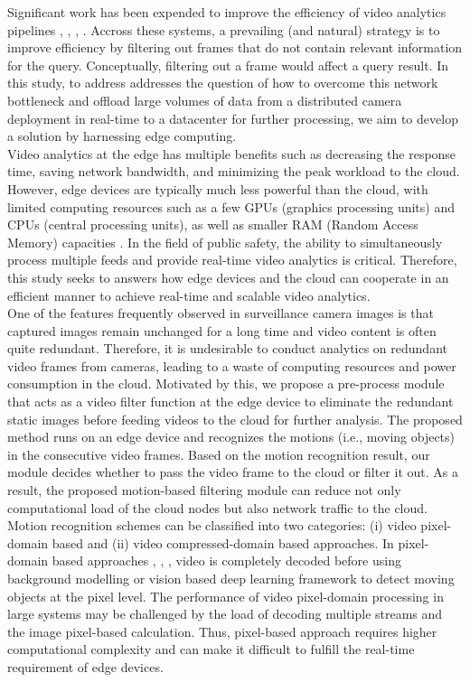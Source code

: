 Significant work has been expended to improve the efficiency of video analytics pipelines \cite{canel2019scaling}, \cite{chen2015glimpse}, \cite{hsieh2018focus}, \cite{jiang2018chameleon}. Accross these systems, a prevailing (and natural) strategy is to improve efficiency by filtering out frames that do not contain relevant information for the query. Conceptually, filtering out a frame would affect a query result. In this study, to address addresses the question of how to overcome this network bottleneck and offload large volumes of data from a distributed camera deployment in real-time to a datacenter for further processing, we aim to develop a solution by harnessing edge computing. \\
Video analytics at the edge has multiple benefits such as decreasing the response time, saving network bandwidth, and minimizing the peak workload to the cloud. However, edge devices are typically much less powerful than the cloud, with limited computing resources such as a few GPUs (graphics processing units) and CPUs (central processing units), as well as smaller RAM (Random Access Memory) capacities \cite{stone2019towards}. In the field of public safety, the ability to simultaneously process multiple feeds and provide real-time video analytics is critical. Therefore, this study seeks to answers how edge devices and the cloud can cooperate in an efficient manner to achieve real-time and scalable video analytics.  \\
One of the features frequently observed in surveillance camera images is that captured images remain unchanged for a long time and video content is often quite redundant. Therefore, it is undesirable to conduct analytics on redundant video frames from cameras, leading to a waste of computing resources and power consumption in the cloud. Motivated by this, we propose a pre-process module that acts as a video filter function at the edge device to eliminate the redundant static images before feeding videos to the cloud for further analysis. The proposed method runs on an edge device and recognizes the motions (i.e., moving objects) in the consecutive video frames. Based on the motion recognition result, our module decides whether to pass the video frame to the cloud or filter it out. As a result, the proposed motion-based filtering module can reduce not only computational load of the cloud nodes but also network traffic to the cloud. \\
Motion recognition schemes can be classified into two categories: (i) video pixel-domain based and (ii) video compressed-domain based approaches. In pixel-domain based approaches \cite{lu2014moving}, \cite{kumar2016segmentation}, \cite{gujrathi2014detecting}, \cite{wang2019ground} video is completely decoded before using background modelling or vision based deep learning framework to detect moving objects at the pixel level. The performance of video pixel-domain processing in large systems may be challenged by the load of decoding multiple streams and the image pixel-based calculation. Thus, pixel-based approach requires higher computational complexity and can make it difficult to fulfill the real-time requirement of edge devices. 
